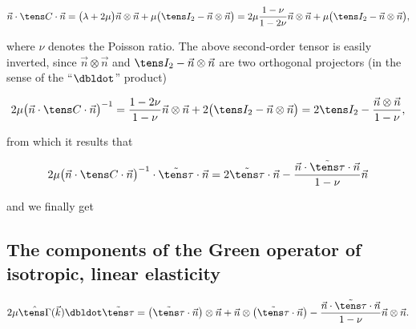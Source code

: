 \documentclass[oneside]{memoir}
\begin{document}
\begin{equation*}
\begin{split}\vec n\cdot\tens C\cdot\vec n
=\bigl(\lambda+2\mu\bigr)\vec n\otimes\vec n
+\mu\bigl(\tens I_2-\vec n\otimes\vec n\bigr)
=2\mu\frac{1-\nu}{1-2\nu}\vec n\otimes\vec n
+\mu\bigl(\tens I_2-\vec n\otimes\vec n\bigr),\end{split}\end{equation*}


where \(\nu\) denotes the Poisson ratio. The above second-order tensor is easily inverted, since \(\vec n\otimes\vec n\) and \(\tens I_2-\vec n\otimes\vec n\) are two orthogonal projectors (in the sense of the “\(\dbldot\)” product)



\begin{equation*}
\begin{split}2\mu\bigl(\vec n\cdot\tens C\cdot\vec n\bigr)^{-1}
=\frac{1-2\nu}{1-\nu}\vec n\otimes\vec n+2\bigl(\tens I_2-\vec n\otimes\vec n\bigr)
=2\tens I_2-\frac{\vec n\otimes\vec n}{1-\nu},\end{split}\end{equation*}


from which it results that



\begin{equation*}
\begin{split}2\mu\bigl(\vec n\cdot\tens C\cdot\vec n\bigr)^{-1}
\cdot\tilde{\tens\tau}\cdot\vec n
=2\tilde{\tens\tau}\cdot\vec n
-\frac{\vec n\cdot\tilde{\tens\tau}\cdot\vec n}{1-\nu}\vec n\end{split}\end{equation*}


and we finally get



\hypertarget{7816488992572278472}{}


\subsection{The components of the Green operator of isotropic, linear elasticity}



\begin{equation*}
\begin{split}2\mu\hat{\tens \Gamma}(\vec k)\dbldot\tilde{\tens \tau}
=\bigl(\tilde{\tens \tau}\cdot\vec n\bigr)\otimes\vec n
+\vec n\otimes\bigl(\tilde{\tens \tau}\cdot\vec n\bigr)
-\frac{\vec n\cdot\tilde{\tens \tau}\cdot\vec n}{1-\nu}\vec n\otimes\vec n.\end{split}\end{equation*}
\end{document}
